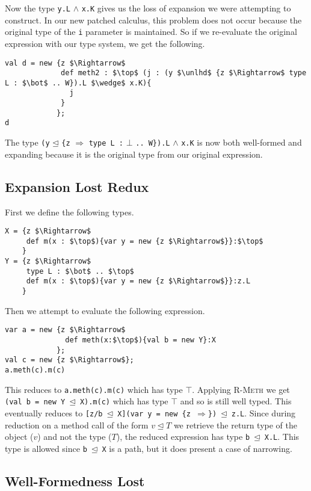\documentclass{llncs}
\begin{document}
Now the type \texttt{y.L} $\wedge$ \texttt{x.K} gives us the loss of 
expansion we were attempting to construct. In our new patched calculus, 
this problem does not occur because the original type of the \texttt{i} 
parameter is maintained. So if we re-evaluate the original expression 
with our type system, we get the following.
\begin{lstlisting}[mathescape, style=custom_lang]
val d = new {z $\Rightarrow$
             def meth2 : $\top$ (j : (y $\unlhd$ {z $\Rightarrow$ type L : $\bot$ .. W}).L $\wedge$ x.K){
               j
             }
            };
d
\end{lstlisting}
The type \texttt{(y} $\unlhd$ \texttt{\{z} $\Rightarrow$ 
\texttt{type L :} $\bot$ \texttt{.. W\}).L} $\wedge$ \texttt{x.K} is now 
both well-formed and expanding because it is the original type 
from our original expression.



\subsection{Expansion Lost Redux}
	\label{s:term_mem2}
First we define the following types.
\begin{lstlisting}[mathescape, style=custom_lang]
X = {z $\Rightarrow$
     def m(x : $\top$){var y = new {z $\Rightarrow$}}:$\top$
    }
Y = {z $\Rightarrow$
     type L : $\bot$ .. $\top$
     def m(x : $\top$){var y = new {z $\Rightarrow$}}:z.L
    }
\end{lstlisting}
Then we attempt to evaluate the following expression.
\begin{lstlisting}[mathescape, style=custom_lang]
var a = new {z $\Rightarrow$
              def meth(x:$\top$){val b = new Y}:X
            };
val c = new {z $\Rightarrow$};
a.meth(c).m(c)
\end{lstlisting}
This reduces to \texttt{a.meth(c).m(c)} which has type $\top$. 
Applying \textsc{R-Meth} we get \texttt{(val b = new Y $\unlhd$ X).m(c)}
which has type $\top$ and so is still well typed. This eventually reduces 
to \texttt{[z/b $\unlhd$ X](var y = new \{z $\Rightarrow$\}) $\unlhd$ z.L}.
Since during reduction on a method call of the form $v \unlhd T$
we retrieve the return type of the object ($v$) and 
not the type ($T$), the reduced expression has type \texttt{b $\unlhd$ X.L}. 
This type is allowed since \texttt{b $\unlhd$ X} is a path, but 
it does present a case of narrowing.

\subsection{Well-Formedness Lost}
\end{document}
